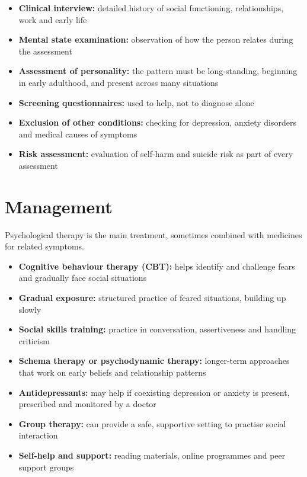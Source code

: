\begin{itemize}
    \item \textbf{Clinical interview:} detailed history of social functioning, relationships, work and early life
    \item \textbf{Mental state examination:} observation of how the person relates during the assessment
    \item \textbf{Assessment of personality:} the pattern must be long-standing, beginning in early adulthood, and present across many situations
    \item \textbf{Screening questionnaires:} used to help, not to diagnose alone
    \item \textbf{Exclusion of other conditions:} checking for depression, anxiety disorders and medical causes of symptoms
    \item \textbf{Risk assessment:} evaluation of self-harm and suicide risk as part of every assessment
\end{itemize}

\section*{Management}
Psychological therapy is the main treatment, sometimes combined with medicines for related symptoms.

\begin{itemize}
    \item \textbf{Cognitive behaviour therapy (CBT):} helps identify and challenge fears and gradually face social situations
    \item \textbf{Gradual exposure:} structured practice of feared situations, building up slowly
    \item \textbf{Social skills training:} practice in conversation, assertiveness and handling criticism
    \item \textbf{Schema therapy or psychodynamic therapy:} longer-term approaches that work on early beliefs and relationship patterns
    \item \textbf{Antidepressants:} may help if coexisting depression or anxiety is present, prescribed and monitored by a doctor
    \item \textbf{Group therapy:} can provide a safe, supportive setting to practise social interaction
    \item \textbf{Self-help and support:} reading materials, online programmes and peer support groups
\end{itemize}

